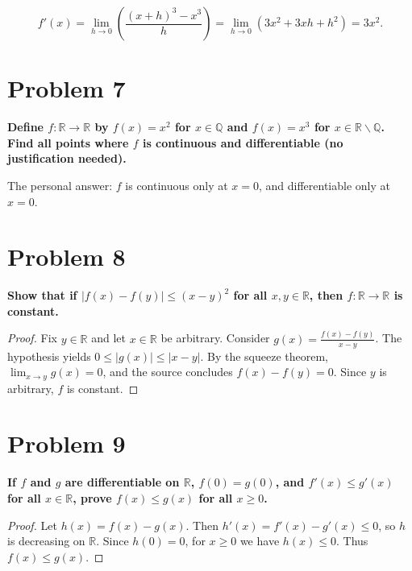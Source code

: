 \[f'(x) = \lim\limits_{h\rightarrow 0}\left( \frac{\left( {x + h} \right)^{3} - x^{3}}{h} \right) = \lim\limits_{h\rightarrow 0}\left( {3x^{2} + 3xh + h^{2}} \right) = 3x^{2}.\]

\section{Problem 7}

\textbf{Define \(f:\mathbb{R}\rightarrow\mathbb{R}\) by \(f(x) = x^{2}\) for \(x \in \mathbb{Q}\) and \(f(x) = x^{3}\) for \(x \in \mathbb{R} \smallsetminus \mathbb{Q}\). Find all points where \(f\) is continuous and differentiable (no justification needed).}

The personal answer: \(f\) is continuous only at \(x = 0\), and differentiable only at \(x = 0\).

\section{Problem 8}

\textbf{Show that if \(\left| {f(x) - f(y)} \right| \leq \left( {x - y} \right)^{2}\) for all \(x,y \in \mathbb{R}\), then \(f:\mathbb{R}\rightarrow\mathbb{R}\) is constant.}

\begin{proof}

Fix \(y \in \mathbb{R}\) and let \(x \in \mathbb{R}\) be arbitrary. Consider \(g(x) = \frac{f(x) - f(y)}{x - y}\). The hypothesis yields \(0 \leq \left| {g(x)} \right| \leq \left| {x - y} \right|\). By the squeeze theorem, \(\lim_{x\rightarrow y}g(x) = 0\), and the source concludes \(f(x) - f(y) = 0\). Since \(y\) is arbitrary, \(f\) is constant.

\end{proof}

\section{Problem 9}

\textbf{If \(f\) and \(g\) are differentiable on \(\mathbb{R}\), \(f(0) = g(0)\), and \(f'(x) \leq g'(x)\) for all \(x \in \mathbb{R}\), prove \(f(x) \leq g(x)\) for all \(x \geq 0\).}

\begin{proof}

Let \(h(x) = f(x) - g(x)\). Then \(h'(x) = f'(x) - g'(x) \leq 0\), so \(h\) is decreasing on \(\mathbb{R}\). Since \(h(0) = 0\), for \(x \geq 0\) we have \(h(x) \leq 0\). Thus \(f(x) \leq g(x)\).

\end{proof}

